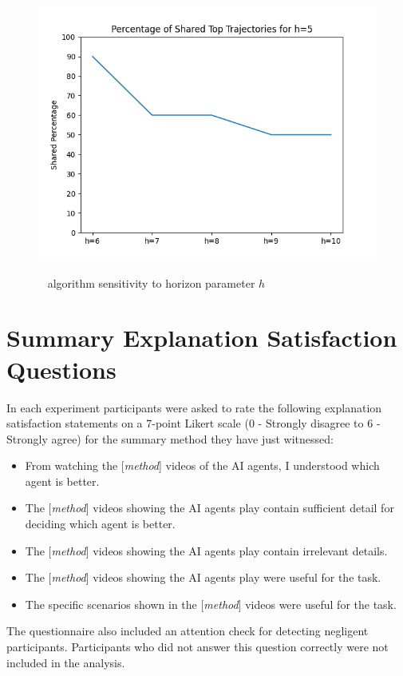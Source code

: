\begin{figure}[ht]
	\centering
    \includegraphics[width=0.98\columnwidth]{images/h_sensitivity.png}\\
	\caption{\disalg~ algorithm sensitivity to horizon parameter $h$}
	\label{fig: h_sensitivity}
\end{figure}

\section{Summary Explanation Satisfaction Questions}
In each experiment participants were asked to rate the following explanation satisfaction statements on a 7-point Likert scale (0 - Strongly disagree to 6 - Strongly agree) for
the summary method they have just witnessed:
\begin{itemize}
	\item From watching the [\emph{method}] videos of the AI agents, I understood which agent is better. 
	\item The [\emph{method}] videos showing the AI agents play contain sufficient detail for deciding which agent is better. 
	\item The [\emph{method}] videos showing the AI agents play contain irrelevant details.
	\item The [\emph{method}] videos showing the AI agents play were useful for the task. 
	\item The specific scenarios shown in the [\emph{method}] videos were useful for the task. 
\end{itemize}
The questionnaire also included an attention check for detecting negligent participants.
Participants who did not answer this question correctly were not included in the analysis.

